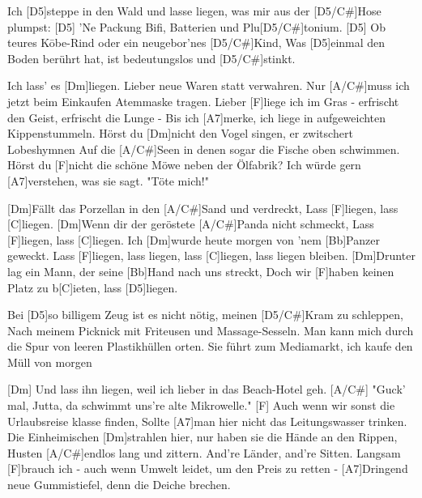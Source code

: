 


\vspace{-0.3em}
\begin{guitar}
	Ich [D5]steppe in den Wald und lasse liegen, was mir aus der [D5/C#]Hose plumpst:
	[D5] 'Ne Packung Bifi, Batterien und Plu[D5/C#]tonium.
	[D5] Ob teures Kōbe-Rind oder ein neugebor'nes [D5/C#]Kind,
	Was [D5]einmal den Boden berührt hat, ist bedeutungslos und [D5/C#]stinkt.
	
	Ich lass' es [Dm]liegen. Lieber neue Waren statt verwahren.
	Nur [A/C#]muss ich jetzt beim Einkaufen Atemmaske tragen.
	Lieber [F]liege ich im Gras - erfrischt den Geist, erfrischt die Lunge -
	Bis ich [A7]merke, ich liege in aufgeweichten Kippenstummeln.
	Hörst du [Dm]nicht den Vogel singen, er zwitschert Lobeshymnen
	Auf die [A/C#]Seen in denen sogar die Fische oben schwimmen.
	Hörst du [F]nicht die schöne Möwe neben der Ölfabrik?
	Ich würde gern [A7]verstehen, was sie sagt. "Töte mich!"
	
	\begin{highlightbar}
		[Dm]Fällt das Porzellan in den [A/C#]Sand und verdreckt,
		Lass [F]liegen, lass [C]liegen.
		[Dm]Wenn dir der geröstete [A/C#]Panda nicht schmeckt,
		Lass [F]liegen, lass [C]liegen.
		Ich [Dm]wurde heute morgen von 'nem [Bb]Panzer geweckt.
		Lass [F]liegen, lass liegen, lass [C]liegen, lass liegen bleiben.
		[Dm]Drunter lag ein Mann, der seine [Bb]Hand nach uns streckt,
		Doch wir [F]haben keinen Platz zu b[C]ieten, lass [D5]liegen.
	\end{highlightbar}
	
	Bei [D5]so billigem Zeug ist es nicht nötig, meinen [D5/C#]Kram zu schleppen,
	Nach meinem Picknick mit Friteusen und Massage-Sesseln.
	Man kann mich durch die Spur von leeren Plastikhüllen orten.
	Sie führt zum Mediamarkt, ich kaufe den Müll von morgen
	
	[Dm] Und lass ihn liegen, weil ich lieber in das Beach-Hotel geh.
	[A/C#] "Guck' mal, Jutta, da schwimmt uns're alte Mikrowelle."
	[F] Auch wenn wir sonst die Urlaubsreise klasse finden,
	Sollte [A7]man hier nicht das Leitungswasser trinken.
	Die Einheimischen [Dm]strahlen hier, nur haben sie die Hände an den Rippen,
	Husten [A/C#]endlos lang und zittern. And're Länder, and're Sitten.
	Langsam [F]brauch ich - auch wenn Umwelt leidet, um den Preis zu retten -
	[A7]Dringend neue Gummistiefel, denn die Deiche brechen.
	

\end{guitar}
